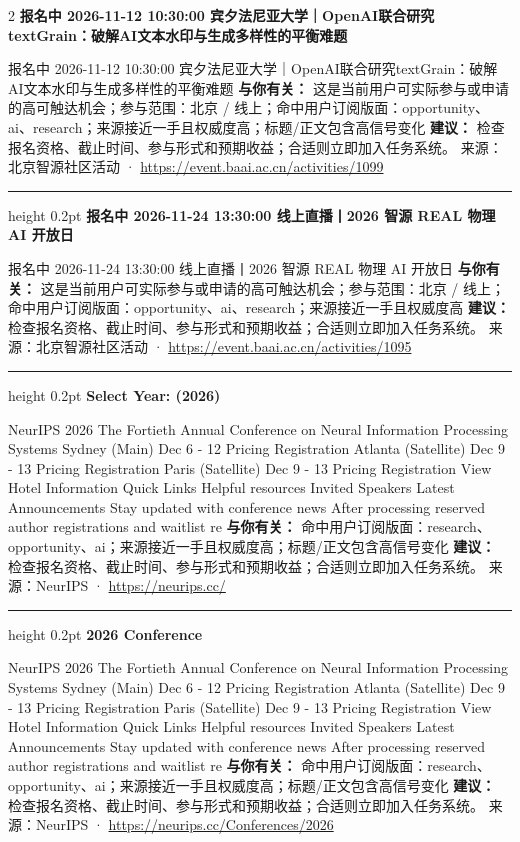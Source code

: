 \documentclass[10.5pt]{ctexart}
\begin{document}
\begin{multicols}{2}
{\large\bfseries 报名中 2026-11-12 10:30:00 宾夕法尼亚大学｜OpenAI联合研究textGrain：破解AI文本水印与生成多样性的平衡难题}\par
报名中 2026-11-12 10:30:00 宾夕法尼亚大学｜OpenAI联合研究textGrain：破解AI文本水印与生成多样性的平衡难题
\textbf{与你有关：} 这是当前用户可实际参与或申请的高可触达机会；参与范围：北京 / 线上；命中用户订阅版面：opportunity、ai、research；来源接近一手且权威度高；标题/正文包含高信号变化
\textbf{建议：} 检查报名资格、截止时间、参与形式和预期收益；合适则立即加入任务系统。
{\footnotesize\color{ormuted} 来源：北京智源社区活动 · \url{https://event.baai.ac.cn/activities/1099}}
\vspace{2mm}
\hrule height 0.2pt
\vspace{2mm}
{\large\bfseries 报名中 2026-11-24 13:30:00 线上直播丨2026 智源 REAL 物理 AI 开放日}\par
报名中 2026-11-24 13:30:00 线上直播丨2026 智源 REAL 物理 AI 开放日
\textbf{与你有关：} 这是当前用户可实际参与或申请的高可触达机会；参与范围：北京 / 线上；命中用户订阅版面：opportunity、ai、research；来源接近一手且权威度高
\textbf{建议：} 检查报名资格、截止时间、参与形式和预期收益；合适则立即加入任务系统。
{\footnotesize\color{ormuted} 来源：北京智源社区活动 · \url{https://event.baai.ac.cn/activities/1095}}
\vspace{2mm}
\hrule height 0.2pt
\vspace{2mm}
{\large\bfseries Select Year: (2026)}\par
NeurIPS 2026 The Fortieth Annual Conference on Neural Information Processing Systems Sydney (Main) Dec 6 - 12 Pricing Registration Atlanta (Satellite) Dec 9 - 13 Pricing Registration Paris (Satellite) Dec 9 - 13 Pricing Registration View Hotel Information Quick Links Helpful resources Invited Speakers Latest Announcements Stay updated with conference news After processing reserved author registrations and waitlist re
\textbf{与你有关：} 命中用户订阅版面：research、opportunity、ai；来源接近一手且权威度高；标题/正文包含高信号变化
\textbf{建议：} 检查报名资格、截止时间、参与形式和预期收益；合适则立即加入任务系统。
{\footnotesize\color{ormuted} 来源：NeurIPS · \url{https://neurips.cc/}}
\vspace{2mm}
\hrule height 0.2pt
\vspace{2mm}
{\large\bfseries 2026 Conference}\par
NeurIPS 2026 The Fortieth Annual Conference on Neural Information Processing Systems Sydney (Main) Dec 6 - 12 Pricing Registration Atlanta (Satellite) Dec 9 - 13 Pricing Registration Paris (Satellite) Dec 9 - 13 Pricing Registration View Hotel Information Quick Links Helpful resources Invited Speakers Latest Announcements Stay updated with conference news After processing reserved author registrations and waitlist re
\textbf{与你有关：} 命中用户订阅版面：research、opportunity、ai；来源接近一手且权威度高；标题/正文包含高信号变化
\textbf{建议：} 检查报名资格、截止时间、参与形式和预期收益；合适则立即加入任务系统。
{\footnotesize\color{ormuted} 来源：NeurIPS · \url{https://neurips.cc/Conferences/2026}}
\end{multicols}
\end{document}
